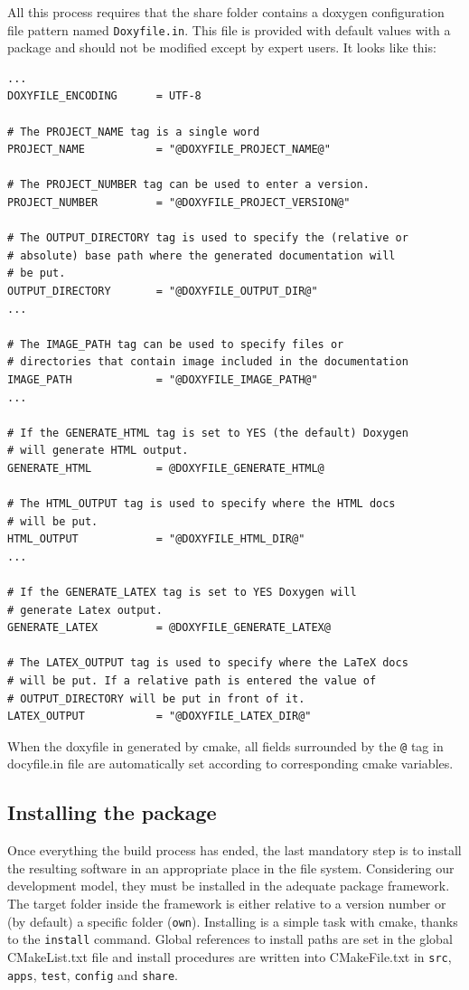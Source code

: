 \documentclass[12pt,a4paper]{article}
\begin{document}
All this process requires that the share folder contains a doxygen configuration file pattern named \texttt{Doxyfile.in}. This file is provided with default values with a package and should not be modified except by expert users. It looks like this:
\begin{verbatim}
...
DOXYFILE_ENCODING      = UTF-8

# The PROJECT_NAME tag is a single word 
PROJECT_NAME           = "@DOXYFILE_PROJECT_NAME@"

# The PROJECT_NUMBER tag can be used to enter a version. 
PROJECT_NUMBER         = "@DOXYFILE_PROJECT_VERSION@"

# The OUTPUT_DIRECTORY tag is used to specify the (relative or 
# absolute) base path where the generated documentation will 
# be put. 
OUTPUT_DIRECTORY       = "@DOXYFILE_OUTPUT_DIR@"
...

# The IMAGE_PATH tag can be used to specify files or 
# directories that contain image included in the documentation
IMAGE_PATH             = "@DOXYFILE_IMAGE_PATH@"
...

# If the GENERATE_HTML tag is set to YES (the default) Doxygen 
# will generate HTML output.
GENERATE_HTML          = @DOXYFILE_GENERATE_HTML@

# The HTML_OUTPUT tag is used to specify where the HTML docs 
# will be put. 
HTML_OUTPUT            = "@DOXYFILE_HTML_DIR@"
...

# If the GENERATE_LATEX tag is set to YES Doxygen will 
# generate Latex output.
GENERATE_LATEX         = @DOXYFILE_GENERATE_LATEX@

# The LATEX_OUTPUT tag is used to specify where the LaTeX docs 
# will be put. If a relative path is entered the value of 
# OUTPUT_DIRECTORY will be put in front of it. 
LATEX_OUTPUT           = "@DOXYFILE_LATEX_DIR@"

\end{verbatim}

When the doxyfile in generated by cmake, all fields surrounded by the \verb|@| tag in docyfile.in file are automatically set according to corresponding cmake variables.

\subsection{Installing the package}

Once everything the build process has ended, the last mandatory step is to install the resulting software in an appropriate place in the file system. Considering our development model, they must be installed in the adequate package framework. The target folder inside the framework is either relative to a version number or (by default) a specific folder (\verb|own|). Installing is a simple task with cmake, thanks to the \verb|install| command. Global references to install paths are set in the global CMakeList.txt file and install procedures are written into CMakeFile.txt in \texttt{src}, \texttt{apps}, \texttt{test}, \texttt{config} and \texttt{share}.
\end{document}
